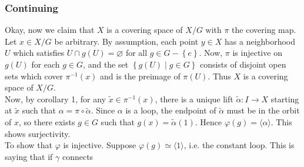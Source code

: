 \documentclass[a4paper]{article}
\begin{document}
 \subsubsection*{Continuing}
 Okay, now we claim that $X$ is a covering space of
 $X /G$ with $\pi$ the covering map. Let
 $x \in X /G$ be arbitrary. By assumption, each point 
 $y \in X$ has a neighborhood $U$ which satisfies
 $U \cap g(U) = \varnothing$ for all
 $g \in G - \left\{ e \right\} $. 
 Now, $\pi$ is injective on $g(U)$ for each $g \in G$, and the set
 $\left\{ g(U)  \mid g \in G \right\} $ consists of disjoint open sets which cover
 $\pi^{-1}(x)$ and is the preimage of
 $\pi(U)$. Thus $X$ is a covering space of $X /G$.\\
 \linebreak
 Now, by corollary 1, for any $\tilde{x} \in \pi^{-1}(x)$, there is a unique
 lift
 $\tilde{\alpha}  \colon I \to X$ starting at $\tilde{x}$ such that
 $\alpha = \pi \circ \tilde{\alpha}$. Since
 $\alpha$ is a loop, the endpoint of $\tilde{\alpha}$ must be in the orbit
 of $x$, so there exists $g \in G$ such that $
 g(x) = \tilde{\alpha}(1)$. Hence
 $\varphi(g) = \langle \alpha \rangle $. This shows surjectivity.\\
 \linebreak
 To show that $\varphi$ is injective. Suppose
 $  \varphi(g) \simeq \langle 1 \rangle $, i.e. the constant loop.
 This is saying that if $ \gamma$ connects
\end{document}
